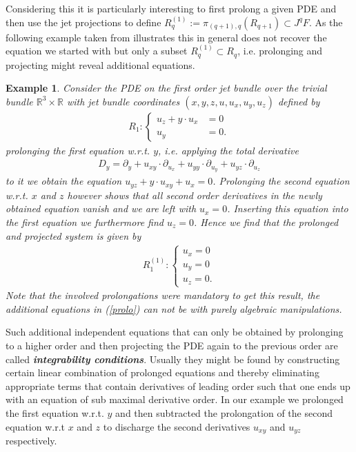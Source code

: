 \documentclass[a4paper,12pt, DIV=14, BCOR=5mm, twoside, headsepline, numbers=noenddot]{scrbook}
\newtheorem{example}{Example}[chapter]
\begin{document}
Considering this it is particularly interesting to first prolong a given PDE and then use the jet projections to define $R_q^{(1)} := \pi_{(q+1),q}\left ( R_{q+1} \right ) \subset J^qF $. As the following example taken from \cite{seiler1994analysis} illustrates this in general does not recover the equation we started with but only a subset $R_q^{(1)} \subset R_q$, i.e. prolonging and projecting might reveal additional equations.
\begin{example}
Consider the PDE on the first order jet bundle over the trivial bundle $\mathbb{R}^3 \times \mathbb{R}$ with jet bundle  coordinates $(x,y,z,u,u_x,u_y,u_z)$ defined by 
\begin{align}
    R_1 : \begin{cases} u_z + y \cdot u_x &= 0 \\
                        u_y &= 0.
            \end{cases}
\end{align}
prolonging the first equation w.r.t. $y$, i.e. applying the total derivative 
\begin{align}
D_y = \partial_y + u_{xy} \cdot \partial_{u_x} + u_{yy} \cdot \partial_{u_y} + u_{yz} \cdot \partial_{u_z}
\end{align}
to it we obtain the equation $u_{yz} + y \cdot u_{xy} + u_x =0$. Prolonging the second equation w.r.t. $x$ and $z$ however shows that all second order derivatives in the newly obtained equation vanish and we are left with $u_x = 0$. Inserting this equation into the first equation we furthermore find $u_z = 0$. Hence we find that the prolonged and projected system is given by 
\begin{align}\label{prolo}
    R_1^{(1)} : \begin{cases} u_x = 0 \\
                        u_y = 0\\
                        u_z = 0 .
            \end{cases}
\end{align}
Note that the involved prolongations were mandatory to get this result, the additional equations in (\ref{prolo})  can not be with purely algebraic manipulations. 
\end{example}
Such additional independent equations that can only be obtained by prolonging to a higher order and then projecting the PDE again to the previous order are called \textit{\textbf{integrability conditions}}. 
Usually they might be found by constructing certain linear combination of prolonged equations and thereby eliminating appropriate terms that contain derivatives of leading order such that one ends up with an equation of sub maximal derivative order. In our example we prolonged the first equation w.r.t. $y$ and then subtracted the prolongation of the second equation w.r.t $x$ and $z$ to discharge the second derivatives $u_{xy}$ and $u_{yz}$ respectively. \\
\end{document}
